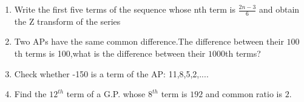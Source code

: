 \begin{enumerate}[label=\thesection.\arabic*,ref=\thesection.\theenumi]
\item Write the first five terms of the sequence whose nth term is $\frac{2n-3}{6}$ and obtain the Z transform of the series\\
\solution

\pagebreak

\item Two APs have the same common difference.The difference between their $100${th} terms is 100,what is the difference between their $1000${th} terms?
\solution

\pagebreak


\item Check whether -150 is a term of the AP: 11,8,5,2,....

 \solution
 
\pagebreak
\item Find the $12^{th}$ term of a G.P. whose
$8^{th}$ term is $192$ and common ratio is $2$.
\solution




\end{enumerate}
